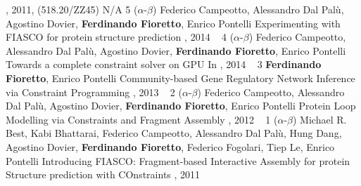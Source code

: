 \begin{pubs}
	{, 2011, (518.20/ZZ45)}{}
	{N/A}
\wsentry 
	{5} %
	{($\alpha$-$\beta$) 
	Federico Campeotto, Alessandro Dal Pal\`{u}, Agostino Dovier, {\bf Ferdinando Fioretto}, Enrico Pontelli} 
  	{Experimenting with FIASCO for protein structure prediction}
	{, 2014}
	{~}
\wsentry 
	{4} %
	{($\alpha$-$\beta$) Federico Campeotto, Alessandro Dal Pal\`{u}, Agostino Dovier, {\bf Ferdinando Fioretto}, Enrico Pontelli}
	{Towards a complete constraint solver on GPU}
	{In , 2014}
	{~}
\wsentry 
	{3} %
	{{\bf Ferdinando Fioretto}, Enrico Pontelli}
	{Community-based Gene Regulatory Network Inference via Constraint Programming}
	{, 2013}
	{~} 
\wsentry
	{2} %
	{($\alpha$-$\beta$) 
	Federico Campeotto, Alessandro Dal Pal\`{u}, Agostino Dovier, {\bf Ferdinando Fioretto}, Enrico Pontelli}
	{Protein Loop Modelling via Constraints and Fragment Assembly}
	{, 2012}
	{~} 
\wsentry 
	{1} %
	{($\alpha$-$\beta$) 
	Michael R. Best, Kabi Bhattarai, Federico Campeotto, Alessandro Dal Pal\`{u}, Hung Dang, Agostino Dovier, {\bf Ferdinando Fioretto}, Federico Fogolari, Tiep Le, Enrico Pontelli}
		{Introducing FIASCO: Fragment-based Interactive Assembly for protein Structure prediction with COnstraints}
 	 {, 2011}
  	{~}
\end{pubs}
